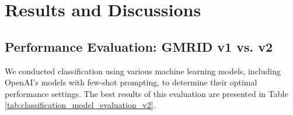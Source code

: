 \section{Results and Discussions}

\subsection{Performance Evaluation: GMRID v1 vs. v2}
\label{subsec:v1_vs_v2}

We conducted classification using various machine learning models, including OpenAI's models with few-shot prompting, to determine their optimal performance settings. The best results of this evaluation are presented in Table \ref{tab:classification_model_evaluation_v2}.

\begin{table}[ht]
\caption{Classification Model Evaluation - Results Comparison Between GMRID v1 (Annotator-Labeled Ground Truth) and GMRID v2 (GPT-4o Labeled Ground Truth). This table presents the F1 scores of various machine learning models, including traditional approaches and LLMs, on both datasets. It demonstrates the performance improvement observed when using the GPT-4o labeled dataset (v2) compared to the human-labeled dataset (v1), suggesting potential benefits of LLM-generated ground truth for training and evaluation.}
\centering
\renewcommand{\arraystretch}{1.2}
\label{tab:classification_model_evaluation_v2}
\end{table}

